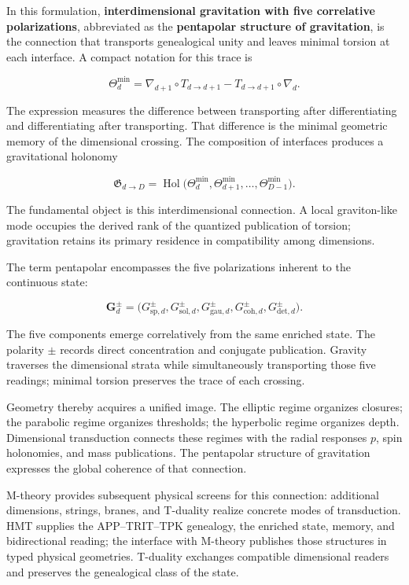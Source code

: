 In this formulation, \textbf{interdimensional gravitation with five correlative polarizations}, abbreviated as the \textbf{pentapolar structure of gravitation}, is the connection that transports genealogical unity and leaves minimal torsion at each interface. A compact notation for this trace is

\[
\Theta_d^{\min}
=
\nabla_{d+1}\circ T_{d\to d+1}
-
T_{d\to d+1}\circ\nabla_d.
\]

The expression measures the difference between transporting after differentiating and differentiating after transporting. That difference is the minimal geometric memory of the dimensional crossing. The composition of interfaces produces a gravitational holonomy

\[
\mathfrak G_{d\to D}
=
\operatorname{Hol}
\bigl(
\Theta_d^{\min},
\Theta_{d+1}^{\min},
\ldots,
\Theta_{D-1}^{\min}
\bigr).
\]

The fundamental object is this interdimensional connection. A local graviton-like mode occupies the derived rank of the quantized publication of torsion; gravitation retains its primary residence in compatibility among dimensions.

The term pentapolar encompasses the five polarizations inherent to the continuous state:

\[
\mathbf G_d^{\pm}
=
\bigl(
G_{\mathrm{sp},d}^{\pm},
G_{\mathrm{sol},d}^{\pm},
G_{\mathrm{gau},d}^{\pm},
G_{\mathrm{coh},d}^{\pm},
G_{\mathrm{det},d}^{\pm}
\bigr).
\]

The five components emerge correlatively from the same enriched state. The polarity \(\pm\) records direct concentration and conjugate publication. Gravity traverses the dimensional strata while simultaneously transporting those five readings; minimal torsion preserves the trace of each crossing.

Geometry thereby acquires a unified image. The elliptic regime organizes closures; the parabolic regime organizes thresholds; the hyperbolic regime organizes depth. Dimensional transduction connects these regimes with the radial responses \(p\), spin holonomies, and mass publications. The pentapolar structure of gravitation expresses the global coherence of that connection.

M-theory provides subsequent physical screens for this connection: additional dimensions, strings, branes, and T-duality realize concrete modes of transduction. HMT supplies the APP–TRIT–TPK genealogy, the enriched state, memory, and bidirectional reading; the interface with M-theory publishes those structures in typed physical geometries. T-duality exchanges compatible dimensional readers and preserves the genealogical class of the state.

